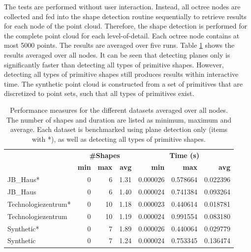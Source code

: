 The tests are performed without user interaction. Instead, all octree nodes are collected and fed into the shape detection routine sequentially to retrieve results for each node of the point cloud. Therefore, the shape detection is performed for the complete point cloud for each level-of-detail. Each octree node contains at most 5000 points. The results are averaged over five runs. Table \ref{table:schnabel_benchmarks} shows the results averaged over all nodes. It can be seen that detecting planes only is significantly faster than detecting all types of primitive shapes. However, detecting all types of primitive shapes still produces results within interactive time. The synthetic point cloud is constructed from a set of primitives that are discretized to point sets, such that all types of primitives exist. 

\begin{table}
    \centering
    \begin{tabular}{ l || r | r | r || r | r | r}
            &\multicolumn{3}{c||}{\textbf{\#Shapes}} & \multicolumn{3}{c}{\textbf{Time (s)}}\\
            &\textbf{min} & \textbf{max} & \textbf{avg}  & \textbf{min} & \textbf{max} & \textbf{avg}  \\
            \hline
            JB\_Haus*           & 0 & 6  & 1.31 & 0.000026 & 0.578664 & 0.022396 \\
            JB\_Haus            & 0 & 6  & 1.40 & 0.000024 & 0.741384 & 0.093264 \\
            Technologiezentrum*	& 0 & 10 & 1.18 & 0.000023 & 0.440614 & 0.018781 \\
            Technologiezentrum  & 0 & 10 & 1.19 & 0.000024 & 0.991554 & 0.083180 \\
            Synthetic*          & 0 & 7  & 1.89 & 0.000026 & 0.440064 & 0.029779 \\
            Synthetic           & 0 & 7  & 1.24 & 0.000024 & 0.753345 & 0.136474 \\
        \end{tabular}
    \caption[Shape-detection performance measure for different datasets]
		{Performance measures for the different datasets averaged over all nodes. The number of shapes and duration are listed as minimum, maximum and average. Each dataset is benchmarked using plane detection only (items with *), as well as detecting all types of primitive shapes. }
    \label{table:schnabel_benchmarks}
\end{table}


